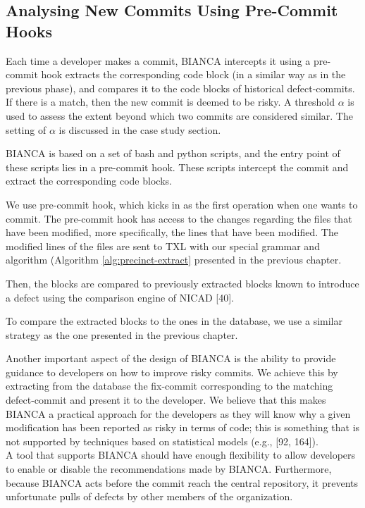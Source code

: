 \documentclass[12pt]{report}
\begin{document}
\subsection{Analysing New Commits Using Pre-Commit
Hooks}\label{sec:online}

Each time a developer makes a commit, BIANCA intercepts it using a
pre-commit hook extracts the corresponding code block (in a similar way
as in the previous phase), and compares it to the code blocks of
historical defect-commits. If there is a match, then the new commit is
deemed to be risky. A threshold \(\alpha\) is used to assess the extent
beyond which two commits are considered similar. The setting of
\(\alpha\) is discussed in the case study section.

BIANCA is based on a set of bash and python scripts, and the entry point
of these scripts lies in a pre-commit hook. These scripts intercept the
commit and extract the corresponding code blocks.

We use pre-commit hook, which kicks in as the first operation when one
wants to commit. The pre-commit hook has access to the changes regarding
the files that have been modified, more specifically, the lines that
have been modified. The modified lines of the files are sent to TXL with
our special grammar and algorithm (Algorithm \ref{alg:precinct-extract}
presented in the previous chapter.

Then, the blocks are compared to previously extracted blocks known to
introduce a defect using the comparison engine of NICAD {[}40{]}.

To compare the extracted blocks to the ones in the database, we use a
similar strategy as the one presented in the previous chapter.

Another important aspect of the design of BIANCA is the ability to
provide guidance to developers on how to improve risky commits. We
achieve this by extracting from the database the fix-commit
corresponding to the matching defect-commit and present it to the
developer. We believe that this makes BIANCA a practical approach for
the developers as they will know why a given modification has been
reported as risky in terms of code; this is something that is not
supported by techniques based on statistical models (e.g., {[}92,
164{]}).\\
A tool that supports BIANCA should have enough flexibility to allow
developers to enable or disable the recommendations made by BIANCA.
Furthermore, because BIANCA acts before the commit reach the central
repository, it prevents unfortunate pulls of defects by other members of
the organization.
\end{document}
